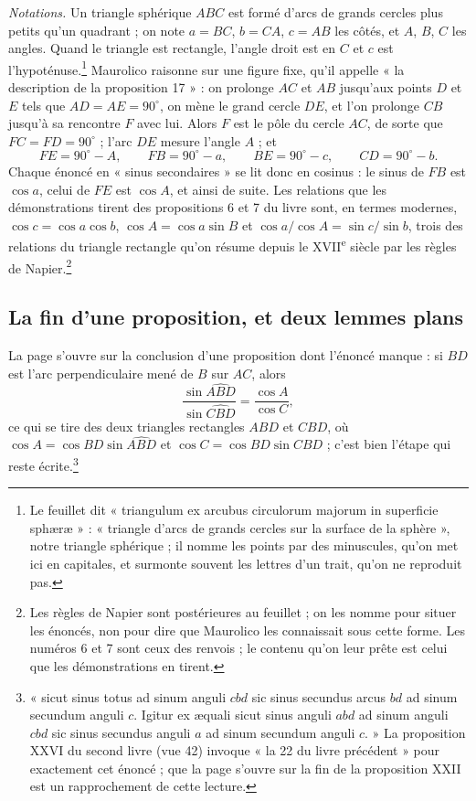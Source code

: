 \documentclass[11pt,a4paper]{article}
\begin{document}
\emph{Notations.} Un triangle sphérique $ABC$ est formé d'arcs de grands cercles
plus petits qu'un quadrant ; on note $a = BC$, $b = CA$, $c = AB$ les côtés, et
$A$, $B$, $C$ les angles. Quand le triangle est rectangle, l'angle droit est en
$C$ et $c$ est l'hypoténuse.\footnote{Le feuillet dit « triangulum ex arcubus
circulorum majorum in superficie sphæræ » : « triangle d'arcs de grands cercles
sur la surface de la sphère », notre triangle sphérique ; il nomme les points par
des minuscules, qu'on met ici en capitales, et surmonte souvent les lettres d'un
trait, qu'on ne reproduit pas.} Maurolico raisonne sur une figure fixe, qu'il
appelle « la description de la proposition 17 » : on prolonge $AC$ et $AB$
jusqu'aux points $D$ et $E$ tels que $AD = AE = 90^\circ$, on mène le grand cercle
$DE$, et l'on prolonge $CB$ jusqu'à sa rencontre $F$ avec lui. Alors $F$ est le pôle
du cercle $AC$, de sorte que $FC = FD = 90^\circ$ ; l'arc $DE$ mesure l'angle
$A$ ; et
\[
FE = 90^\circ - A,\qquad FB = 90^\circ - a,\qquad BE = 90^\circ - c,\qquad
CD = 90^\circ - b .
\]
Chaque énoncé en « sinus secondaires » se lit donc en cosinus : le sinus de $FB$
est $\cos a$, celui de $FE$ est $\cos A$, et ainsi de suite. Les relations que
les démonstrations tirent des propositions 6 et 7 du livre sont, en termes
modernes, $\cos c = \cos a\cos b$, $\cos A = \cos a\sin B$ et
$\cos a/\cos A = \sin c/\sin b$, trois des relations du triangle rectangle
qu'on résume depuis le XVII\textsuperscript{e} siècle par les règles de
Napier.\footnote{Les règles de Napier sont postérieures au feuillet ; on les nomme
pour situer les énoncés, non pour dire que Maurolico les connaissait sous cette
forme. Les numéros 6 et 7 sont ceux des renvois ; le contenu qu'on leur prête est
celui que les démonstrations en tirent.}

\subsection*{La fin d'une proposition, et deux lemmes plans}

La page s'ouvre sur la conclusion d'une proposition dont l'énoncé manque : si
$BD$ est l'arc perpendiculaire mené de $B$ sur $AC$, alors
\[
\frac{\sin \widehat{ABD}}{\sin \widehat{CBD}} = \frac{\cos A}{\cos C},
\]
ce qui se tire des deux triangles rectangles $ABD$ et $CBD$, où
$\cos A = \cos BD \sin\widehat{ABD}$ et $\cos C = \cos BD \sin\widehat{CBD}$ ;
c'est bien l'étape qui reste écrite.\footnote{« sicut sinus totus ad sinum
anguli $cbd$ sic sinus secundus arcus $bd$ ad sinum secundum anguli $c$. Igitur ex
æquali sicut sinus anguli $abd$ ad sinum anguli $cbd$ sic sinus secundus anguli
$a$ ad sinum secundum anguli $c$. » La proposition XXVI du second livre (vue 42)
invoque « la 22 du livre précédent » pour exactement cet énoncé ; que la page
s'ouvre sur la fin de la proposition XXII est un rapprochement de cette lecture.}
\end{document}

